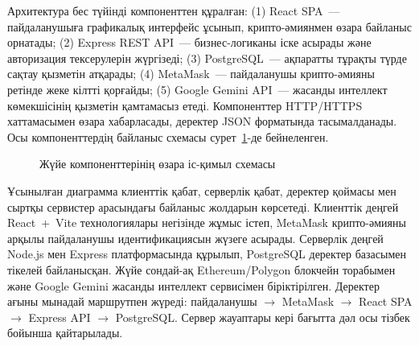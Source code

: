 \documentclass[14pt,a4paper]{extarticle}
\begin{document}
Архитектура бес түйінді компоненттен құралған: (1) React SPA~--- пайдаланушыға графикалық интерфейс ұсынып, крипто-әмиянмен өзара байланыс орнатады; (2) Express REST API~--- бизнес-логиканы іске асырады және авторизация тексерулерін жүргізеді; (3) PostgreSQL~--- ақпаратты тұрақты түрде сақтау қызметін атқарады; (4) MetaMask~--- пайдаланушы крипто-әмияны ретінде жеке кілтті қорғайды; (5) Google Gemini API~--- жасанды интеллект көмекшісінің қызметін қамтамасыз етеді. Компоненттер HTTP/HTTPS хаттамасымен өзара хабарласады, деректер JSON форматында тасымалданады. Осы компоненттердің байланыс схемасы сурет~\ref{fig:architecture}-де бейнеленген.

\begin{figure}[H]
\centering
{}
\caption{Жүйе компоненттерінің өзара іс-қимыл схемасы}
\label{fig:architecture}
\end{figure}

Ұсынылған диаграмма клиенттік қабат, серверлік қабат, деректер қоймасы мен сыртқы сервистер арасындағы байланыс жолдарын көрсетеді. Клиенттік деңгей React~+~Vite технологиялары негізінде жұмыс істеп, MetaMask крипто-әмияны арқылы пайдаланушы идентификациясын жүзеге асырады. Серверлік деңгей Node.js мен Express платформасында құрылып, PostgreSQL деректер базасымен тікелей байланысқан. Жүйе сондай-ақ Ethereum/Polygon блокчейн торабымен және Google Gemini жасанды интеллект сервисімен біріктірілген. Деректер ағыны мынадай маршрутпен жүреді: пайдаланушы $\to$ MetaMask $\to$ React SPA $\to$ Express API $\to$ PostgreSQL. Сервер жауаптары кері бағытта дәл осы тізбек бойынша қайтарылады.
\end{document}
